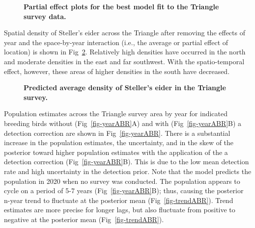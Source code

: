 \documentclass[
  10pt,
  letterpaper,
]{article}
\begin{document}
\begin{figure}

\caption{\label{fig-model}\textbf{Partial effect plots for the best model fit to the Triangle survey data.}}

\end{figure}%

Spatial density of Steller's eider across the Triangle after removing
the effects of year and the space-by-year interaction (i.e., the average
or partial effect of location) is shown in Fig~\ref{fig-densityABR}.
Relatively high densities have occurred in the north and moderate
densities in the east and far southwest. With the spatio-temporal
effect, however, these areas of higher densities in the south have
decreased.

\begin{figure}

\caption{\label{fig-densityABR}\textbf{Predicted average density of Steller's eider in the Triangle survey.}}

\end{figure}%

Population estimates across the Triangle survey area by year for
indicated breeding birds without (Fig~\ref{fig-yearABR}A) and with (Fig~\ref{fig-yearABR}B) a detection correction are shown in Fig~\ref{fig-yearABR}. There is a substantial increase in the population estimates, the uncertainty, and in the skew of the posterior toward higher population estimates with the application of the a detection correction (Fig~\ref{fig-yearABR}B). This is due to the low mean detection rate and high uncertainty in the detection prior. Note that the model predicts the population in 2020 when no survey was conducted. The population appears to cycle on a period of 5-7 years (Fig~\ref{fig-yearABR}B); thus, causing the posterior n-year trend to fluctuate at the posterior mean (Fig~\ref{fig-trendABR}). Trend estimates are more precise for longer lags, but also fluctuate from positive to negative at the posterior mean (Fig~\ref{fig-trendABR}).
\end{document}
